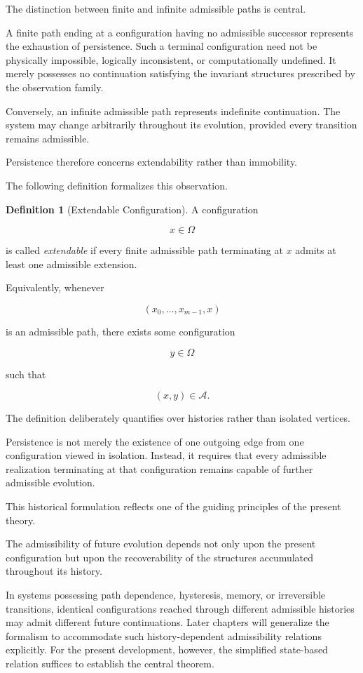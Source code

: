 \documentclass[11pt]{book}
\numberwithin{equation}{chapter}
\theoremstyle{definition}
\newtheorem{definition}{Definition}[chapter]
\theoremstyle{plain}
\begin{document}
The distinction between finite and infinite admissible paths is central.

A finite path ending at a configuration having no admissible successor represents the exhaustion of persistence. Such a terminal configuration need not be physically impossible, logically inconsistent, or computationally undefined. It merely possesses no continuation satisfying the invariant structures prescribed by the observation family.

Conversely, an infinite admissible path represents indefinite continuation. The system may change arbitrarily throughout its evolution, provided every transition remains admissible.

Persistence therefore concerns extendability rather than immobility.

The following definition formalizes this observation.

\begin{definition}[Extendable Configuration]

A configuration

\[
x\in\Omega
\]

is called \emph{extendable} if every finite admissible path terminating at \(x\) admits at least one admissible extension.

Equivalently, whenever

\[
(x_0,\ldots,x_{m-1},x)
\]

is an admissible path, there exists some configuration

\[
y\in\Omega
\]

such that

\[
(x,y)\in\mathcal A.
\]

\end{definition}

The definition deliberately quantifies over histories rather than isolated vertices.

Persistence is not merely the existence of one outgoing edge from one configuration viewed in isolation. Instead, it requires that every admissible realization terminating at that configuration remains capable of further admissible evolution.

This historical formulation reflects one of the guiding principles of the present theory.

The admissibility of future evolution depends not only upon the present configuration but upon the recoverability of the structures accumulated throughout its history.

In systems possessing path dependence, hysteresis, memory, or irreversible transitions, identical configurations reached through different admissible histories may admit different future continuations. Later chapters will generalize the formalism to accommodate such history-dependent admissibility relations explicitly. For the present development, however, the simplified state-based relation suffices to establish the central theorem.
\end{document}
